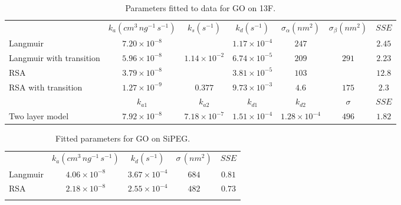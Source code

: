 %
\begin{table}
\caption{\label{tab:GO params 13F}Parameters fitted to data for GO on 13F.}
\begin{tabular}{>{\raggedright}p{0.75in}cccccc}
 & $k_{a}\left(cm^{3}\, ng^{-1}\, s^{-1}\right)$ & $k_{s}\left(s^{-1}\right)$ & $k_{d}\left(s^{-1}\right)$ & $\sigma_{\alpha}\left(nm^{2}\right)$ & $\sigma_{\beta}\left(nm^{2}\right)$ & $SSE$\tabularnewline[\doublerulesep]
\cline{2-7} 
\noalign{\vskip\doublerulesep}
Langmuir & $7.20\times10^{-8}$ &  & $1.17\times10^{-4}$ & $247$ &  & $2.45$\tabularnewline
Langmuir with transition & $5.96\times10^{-8}$ & $1.14\times10^{-2}$ & $6.74\times10^{-5}$ & $209$ & $291$ & $2.23$\tabularnewline
\noalign{\vskip\doublerulesep}
RSA & $3.79\times10^{-8}$ &  & $3.81\times10^{-5}$ & $103$ &  & $12.8$\tabularnewline
\noalign{\vskip\doublerulesep}
RSA with transition & $1.27\times10^{-9}$ & $0.377$ & $9.73\times10^{-3}$ & $4.6$ & $175$ & $2.3$\tabularnewline
\noalign{\vskip\doublerulesep}
\noalign{\vskip\doublerulesep}
 & $k_{a1}$ & $k_{a2}$ & $k_{d1}$ & $k_{d2}$ & $\sigma$ & $SSE$\tabularnewline
Two layer model & $7.92\times10^{-8}$ & $7.18\times10^{-7}$ & $1.51\times10^{-4}$ & $1.28\times10^{-4}$ & $496$ & $1.82$\tabularnewline
\end{tabular}%
\end{table}
%
\begin{table}
\caption{\label{tab:GO params PEG}Fitted parameters for GO on SiPEG.}
\begin{tabular}{>{\raggedright}p{0.75in}cccc}
 & $k_{a}\left(cm^{3}\, ng^{-1}\, s^{-1}\right)$ & $k_{d}\left(s^{-1}\right)$ & $\sigma\,\left(nm^{2}\right)$ & $SSE$\tabularnewline[\doublerulesep]
\cline{2-5} 
\noalign{\vskip\doublerulesep}
Langmuir & $4.06\times10^{-8}$ & $3.67\times10^{-4}$ & $684$ & $0.81$\tabularnewline
\noalign{\vskip\doublerulesep}
RSA & $2.18\times10^{-8}$ & $2.55\times10^{-4}$ & $482$ & $0.73$\tabularnewline
\noalign{\vskip\doublerulesep}
\end{tabular}

%
\end{table}


